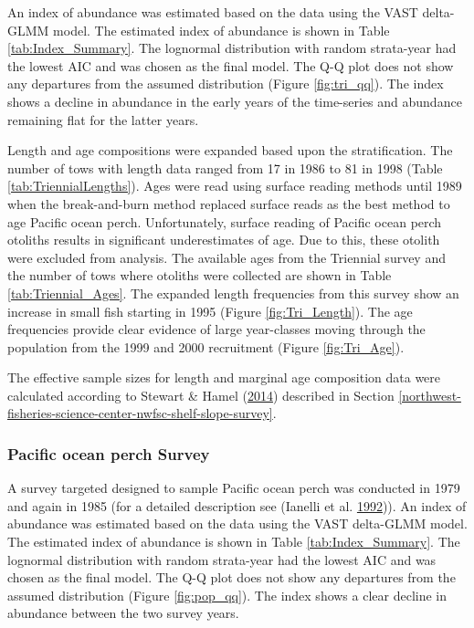 \documentclass[12pt,]{article}
\begin{document}
An index of abundance was estimated based on the data using the VAST
delta-GLMM model. The estimated index of abundance is shown in Table
\ref{tab:Index_Summary}. The lognormal distribution with random
strata-year had the lowest AIC and was chosen as the final model. The
Q-Q plot does not show any departures from the assumed distribution
(Figure \ref{fig:tri_qq}). The index shows a decline in abundance in the
early years of the time-series and abundance remaining flat for the
latter years.

Length and age compositions were expanded based upon the stratification.
The number of tows with length data ranged from 17 in 1986 to 81 in 1998
(Table \ref{tab:TriennialLengths}). Ages were read using surface reading
methods until 1989 when the break-and-burn method replaced surface reads
as the best method to age Pacific ocean perch. Unfortunately, surface
reading of Pacific ocean perch otoliths results in significant
underestimates of age. Due to this, these otolith were excluded from
analysis. The available ages from the Triennial survey and the number of
tows where otoliths were collected are shown in Table
\ref{tab:Triennial_Ages}. The expanded length frequencies from this
survey show an increase in small fish starting in 1995 (Figure
\ref{fig:Tri_Length}). The age frequencies provide clear evidence of
large year-classes moving through the population from the 1999 and 2000
recruitment (Figure \ref{fig:Tri_Age}).

The effective sample sizes for length and marginal age composition data
were calculated according to Stewart \& Hamel
(\protect\hyperlink{ref-stewart_bootstrapping_2014}{2014}) described in
Section
\ref{northwest-fisheries-science-center-nwfsc-shelf-slope-survey}.

\subsubsection{Pacific ocean perch
Survey}\label{pacific-ocean-perch-survey}

A survey targeted designed to sample Pacific ocean perch was conducted
in 1979 and again in 1985 (for a detailed description see (Ianelli et
al. \protect\hyperlink{ref-ianelli_status_1992}{1992})). An index of
abundance was estimated based on the data using the VAST delta-GLMM
model. The estimated index of abundance is shown in Table
\ref{tab:Index_Summary}. The lognormal distribution with random
strata-year had the lowest AIC and was chosen as the final model. The
Q-Q plot does not show any departures from the assumed distribution
(Figure \ref{fig:pop_qq}). The index shows a clear decline in abundance
between the two survey years.
\end{document}
